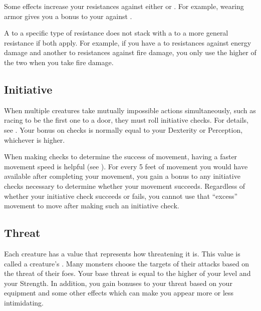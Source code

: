             Some effects increase your resistances against either  or .
            For example, wearing armor gives you a bonus to your  against .

             A  to a specific type of resistance does not stack with a  to a more general resistance if both apply.
            For example, if you have a  to resistances against energy damage and another  to resistances against fire damage, you only use the higher of the two when you take fire damage.

    \subsection{Initiative}\label{Initiative}
        When multiple creatures take mutually impossible actions simultaneously, such as racing to be the first one to a door, they must roll initiative checks.
        For details, see .
        Your bonus on  checks is normally equal to your Dexterity or Perception, whichever is higher.

        \label{Movement-Based Initiative}
        When making  checks to determine the success of movement, having a faster movement speed is helpful (see ).
        For every 5 feet of movement you would have available after completing your movement, you gain a  bonus to any initiative checks necessary to determine whether your movement succeeds.
        Regardless of whether your initiative check succeeds or fails, you cannot use that ``excess'' movement to move after making such an initiative check.

    \subsection{Threat}\label{Threat}
        Each creature has a value that represents how threatening it is.
        This value is called a creature's .
        Many monsters choose the targets of their attacks based on the threat of their foes.
        Your base threat is equal to the higher of your level and your Strength.
        In addition, you gain bonuses to your threat based on your equipment and some other effects which can make you appear more or less intimidating.

